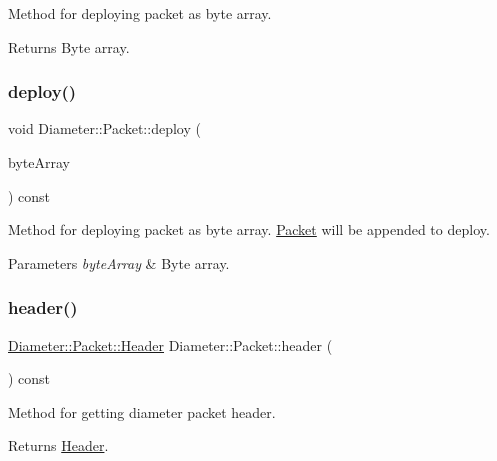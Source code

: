 Method for deploying packet as byte array. 

\begin{DoxyReturn}{Returns}
Byte array. 
\end{DoxyReturn}
\mbox{\label{classDiameter_1_1Packet_a2a41d20364b4b73787c9cf5af2ee6001}} 
\subsubsection{\texorpdfstring{deploy()}{deploy()}\hspace{0.1cm}{\footnotesize\ttfamily [2/2]}}
{\footnotesize\ttfamily void Diameter\+::\+Packet\+::deploy (\begin{DoxyParamCaption}\item[{Byte\+Array \&}]{byte\+Array }\end{DoxyParamCaption}) const}



Method for deploying packet as byte array. \hyperlink{classDiameter_1_1Packet}{Packet} will be appended to deploy. 


\begin{DoxyParams}{Parameters}
{\em byte\+Array} & Byte array. \\
\hline
\end{DoxyParams}
\mbox{\label{classDiameter_1_1Packet_a9afb9a360694064175f2684bcd1668ce}} 
\subsubsection{\texorpdfstring{header()}{header()}\hspace{0.1cm}{\footnotesize\ttfamily [1/2]}}
{\footnotesize\ttfamily \hyperlink{classDiameter_1_1Packet_1_1Header}{Diameter\+::\+Packet\+::\+Header} Diameter\+::\+Packet\+::header (\begin{DoxyParamCaption}{ }\end{DoxyParamCaption}) const}



Method for getting diameter packet header. 

\begin{DoxyReturn}{Returns}
\hyperlink{classDiameter_1_1Packet_1_1Header}{Header}. 
\end{DoxyReturn}
\mbox{\label{classDiameter_1_1Packet_a33d371227da437251b2875baa5a97dbd}} 
